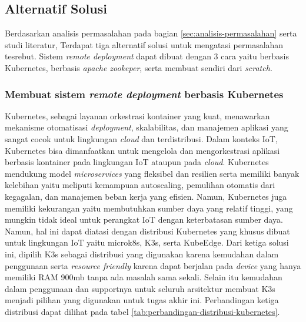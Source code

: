 \subsection{Alternatif Solusi}
\label{sec:analisis-solusi}

Berdasarkan analisis permasalahan pada bagian \ref{sec:analisis-permasalahan} serta studi literatur, Terdapat tiga alternatif solusi untuk mengatasi permasalahan tesrebut. Sistem \textit{remote deployment} dapat dibuat dengan 3 cara yaitu berbasis Kubernetes, berbasis \textit{apache zookeper}, serta membuat sendiri dari \textit{scratch}.

\subsubsection{Membuat sistem \textit{remote deployment} berbasis Kubernetes}
Kubernetes, sebagai layanan orkestrasi kontainer yang kuat, menawarkan mekanisme otomatisasi \textit{deployment}, skalabilitas, dan manajemen aplikasi yang sangat cocok untuk lingkungan \textit{cloud} dan terdistribusi. Dalam konteks IoT, Kubernetes bisa dimanfaatkan untuk mengelola dan mengorkestrasi aplikasi berbasis kontainer pada lingkungan IoT ataupun pada \textit{cloud}. Kubernetes mendukung model \textit{microservices} yang fleksibel dan resilien serta memiliki banyak kelebihan yaitu  meliputi kemampuan autoscaling, pemulihan otomatis dari kegagalan, dan manajemen beban kerja yang efisien. Namun, Kubernetes juga memiliki kekurangan yaitu membutuhkan sumber daya yang relatif tinggi, yang mungkin tidak ideal untuk perangkat IoT dengan keterbatasan sumber daya. Namun, hal ini dapat diatasi dengan distribusi Kubernetes yang khusus dibuat untuk lingkungan IoT yaitu microk8s, K3s, serta KubeEdge. Dari ketiga solusi ini, dipilih K3s sebagai distribusi yang digunakan karena kemudahan dalam penggunaan serta \textit{resource friendly} karena dapat berjalan pada \textit{device} yang hanya memiliki RAM 900mb tanpa ada masalah sama sekali. Selain itu kemudahan dalam penggunaan dan supportnya untuk seluruh arsitektur membuat K3s menjadi pilihan yang digunakan untuk tugas akhir ini. Perbandingan ketiga distribusi dapat dilihat pada tabel \ref{tab:perbandingan-distribusi-kubernetes}.


